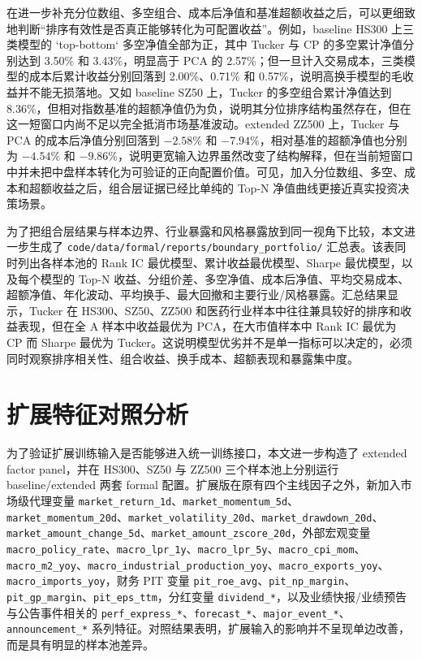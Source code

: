 在进一步补充分位数组、多空组合、成本后净值和基准超额收益之后，可以更细致地判断“排序有效性是否真正能够转化为可配置收益”。例如，baseline HS300 上三类模型的 `top-bottom` 多空净值全部为正，其中 Tucker 与 CP 的多空累计净值分别达到 3.50\% 和 3.43\%，明显高于 PCA 的 2.57\%；但一旦计入交易成本，三类模型的成本后累计收益分别回落到 2.00\%、0.71\% 和 0.57\%，说明高换手模型的毛收益并不能无损落地。又如 baseline SZ50 上，Tucker 的多空组合累计净值达到 8.36\%，但相对指数基准的超额净值仍为负，说明其分位排序结构虽然存在，但在这一短窗口内尚不足以完全抵消市场基准波动。extended ZZ500 上，Tucker 与 PCA 的成本后净值分别回落到 $-2.58\%$ 和 $-7.94\%$，相对基准的超额净值也分别为 $-4.54\%$ 和 $-9.86\%$，说明更宽输入边界虽然改变了结构解释，但在当前短窗口中并未把中盘样本转化为可验证的正向配置价值。可见，加入分位数组、多空、成本和超额收益之后，组合层证据已经比单纯的 Top-N 净值曲线更接近真实投资决策场景。

为了把组合层结果与样本边界、行业暴露和风格暴露放到同一视角下比较，本文进一步生成了 \texttt{code/data/formal/reports/boundary\_portfolio/} 汇总表。该表同时列出各样本池的 Rank IC 最优模型、累计收益最优模型、Sharpe 最优模型，以及每个模型的 Top-N 收益、分组价差、多空净值、成本后净值、平均交易成本、超额净值、年化波动、平均换手、最大回撤和主要行业/风格暴露。汇总结果显示，Tucker 在 HS300、SZ50、ZZ500 和医药行业样本中往往兼具较好的排序和收益表现，但在全 A 样本中收益最优为 PCA，在大市值样本中 Rank IC 最优为 CP 而 Sharpe 最优为 Tucker。这说明模型优劣并不是单一指标可以决定的，必须同时观察排序相关性、组合收益、换手成本、超额表现和暴露集中度。

\section{扩展特征对照分析}

为了验证扩展训练输入是否能够进入统一训练接口，本文进一步构造了 extended factor panel，并在 HS300、SZ50 与 ZZ500 三个样本池上分别运行 baseline/extended 两套 formal 配置。扩展版在原有四个主线因子之外，新加入市场级代理变量 \texttt{market\_return\_1d}、\texttt{market\_momentum\_5d}、\texttt{market\_momentum\_20d}、\texttt{market\_volatility\_20d}、\texttt{market\_drawdown\_20d}、\texttt{market\_amount\_change\_5d}、\texttt{market\_amount\_zscore\_20d}，外部宏观变量 \texttt{macro\_policy\_rate}、\texttt{macro\_lpr\_1y}、\texttt{macro\_lpr\_5y}、\texttt{macro\_cpi\_mom}、\texttt{macro\_m2\_yoy}、\texttt{macro\_industrial\_production\_yoy}、\texttt{macro\_exports\_yoy}、\texttt{macro\_imports\_yoy}，财务 PIT 变量 \texttt{pit\_roe\_avg}、\texttt{pit\_np\_margin}、\texttt{pit\_gp\_margin}、\texttt{pit\_eps\_ttm}，分红变量 \texttt{dividend\_*}，以及业绩快报/业绩预告与公告事件相关的 \texttt{perf\_express\_*}、\texttt{forecast\_*}、\texttt{major\_event\_*}、\texttt{announcement\_*} 系列特征。对照结果表明，扩展输入的影响并不呈现单边改善，而是具有明显的样本池差异。

